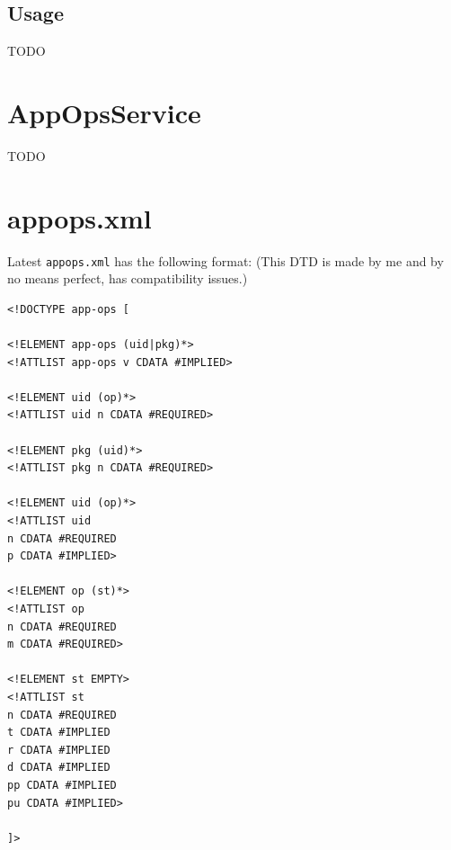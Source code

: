 \subsection{Usage}\label{subsec:usage}
TODO

\section{AppOpsService}\label{sec:appopsservice}
TODO

\section{appops.xml}\label{sec:appops-xml}

Latest \texttt{appops.xml} has the following format: (This DTD is made by me and by no means perfect, has compatibility issues.)

\begin{Verbatim}
<!DOCTYPE app-ops [

<!ELEMENT app-ops (uid|pkg)*>
<!ATTLIST app-ops v CDATA #IMPLIED>

<!ELEMENT uid (op)*>
<!ATTLIST uid n CDATA #REQUIRED>

<!ELEMENT pkg (uid)*>
<!ATTLIST pkg n CDATA #REQUIRED>

<!ELEMENT uid (op)*>
<!ATTLIST uid
n CDATA #REQUIRED
p CDATA #IMPLIED>

<!ELEMENT op (st)*>
<!ATTLIST op
n CDATA #REQUIRED
m CDATA #REQUIRED>

<!ELEMENT st EMPTY>
<!ATTLIST st
n CDATA #REQUIRED
t CDATA #IMPLIED
r CDATA #IMPLIED
d CDATA #IMPLIED
pp CDATA #IMPLIED
pu CDATA #IMPLIED>

]>
\end{Verbatim}

